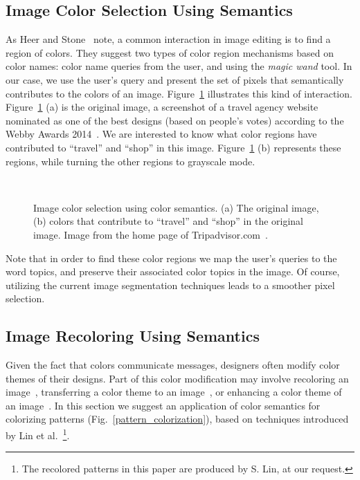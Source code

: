 \documentclass[prodmode,acmtochi]{acmsmall}
\begin{document}
\subsection{Image Color Selection Using Semantics}

As Heer and Stone~\cite{heer2010crowdsourcing} note, a common interaction in image editing is to find a region of colors. They suggest two types of color region mechanisms based on color names: color name queries from the user, and using the \emph{magic wand} tool.
In our case, we use the user's query and present the set of pixels that semantically contributes to the colors of an image.
Figure~\ref{color_selection} illustrates this kind of interaction. Figure~\ref{color_selection} (a) is the original image, a screenshot of a travel agency website~\cite{tripadvisor} nominated as one of the best designs (based on people's votes) according to the Webby Awards 2014~\cite{webbyawards}.
We are interested to know what color regions have contributed to ``travel'' and ``shop'' in this image.
Figure~\ref{color_selection} (b) represents these regions, while turning the other regions to grayscale mode.

\begin{figure}[h!tb]\tiny
  \centering
   \ \
   \ \
\caption{Image color selection using color semantics. (a) The original image, (b) colors that contribute to ``travel'' and ``shop'' in the original image. Image from the home page of Tripadvisor.com~\protect\cite{tripadvisor}.}
  \label{color_selection}
\end{figure}

Note that in order to find these color regions we map the user's queries to the word topics, and preserve their associated color topics in the image. Of course, utilizing the current image segmentation techniques leads to a smoother pixel selection.

\subsection{Image Recoloring Using Semantics}

Given the fact that colors communicate messages, designers often modify color themes of their designs. Part of this color modification may involve recoloring an image~\cite{2013-patternColoring}, transferring a color theme to an image~\cite{murray2012toward}, or enhancing a color theme of an image~\cite{wang2010data}.
In this section we suggest an application of color semantics for colorizing patterns (Fig.~\ref{pattern_colorization}), based on techniques introduced by Lin et al.~\cite{2013-patternColoring}\footnote{The recolored patterns in this paper are produced by S. Lin, at our request.}.
\end{document}
